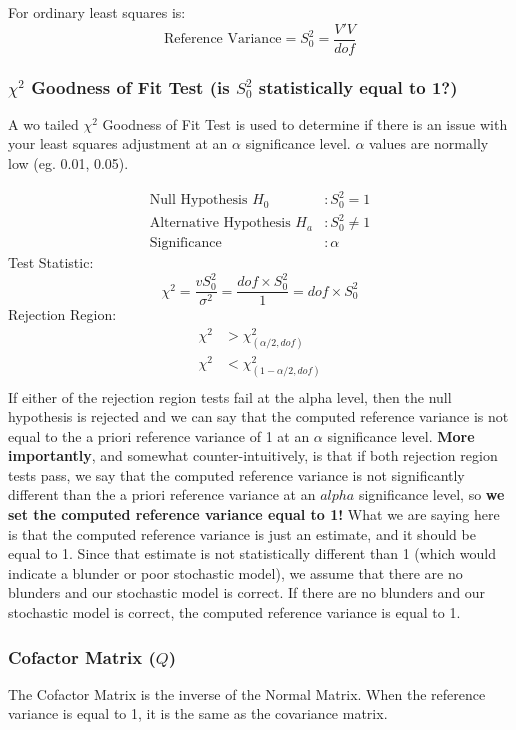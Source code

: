 For ordinary least squares is:
\[
\text{Reference Variance} = S_0^2 = \dfrac{V'V}{dof}
\]

\subsubsection*{$\chi^2$ Goodness of Fit Test (is $S_0^2$ statistically equal to 1?)}
A wo tailed $\chi^2$ Goodness of Fit Test is used to determine if there is an issue with your least squares adjustment at an $\alpha$ significance level.  $\alpha$ values are normally low (eg. 0.01, 0.05).

\begin{align*}
\text{Null Hypothesis } H_0 &: S_0^2 = 1 \\
\text{Alternative Hypothesis } H_a &: S_0^2 \neq 1 \\
\text{Significance } &: \alpha
\end{align*}
Test Statistic:
\[
\chi^2 = \dfrac{vS_0^2}{\sigma^2} = \dfrac{dof\times S_0^2}{1} = dof\times S_0^2
\]
Rejection Region:
\begin{align*}
\chi^2 &> \chi_{(\alpha/2,dof)}^2 \\
\chi^2 &< \chi_{(1-\alpha/2,dof)}^2 \\
\end{align*}
If either of the rejection region tests fail at the alpha level, then the null hypothesis is rejected and we can say that the computed reference variance is not equal to the a priori reference variance of 1 at an $\alpha$ significance level.  \textbf{More importantly}, and somewhat counter-intuitively, is that if both rejection region tests pass, we say that the computed reference variance is not significantly different than the a priori reference variance at an $alpha$ significance level, so \textbf{we set the computed reference variance equal to 1!}  What we are saying here is that the computed reference variance is just an estimate, and it should be equal to 1.  Since that estimate is not statistically different than 1 (which would indicate a blunder or poor stochastic model), we assume that there are no blunders and our stochastic model is correct.  If there are no blunders and our stochastic model is correct, the computed reference variance is equal to 1.
\subsubsection*{Cofactor Matrix ($Q$)}
The Cofactor Matrix is the inverse of the Normal Matrix.  When the reference variance is equal to 1, it is the same as the covariance matrix.  

